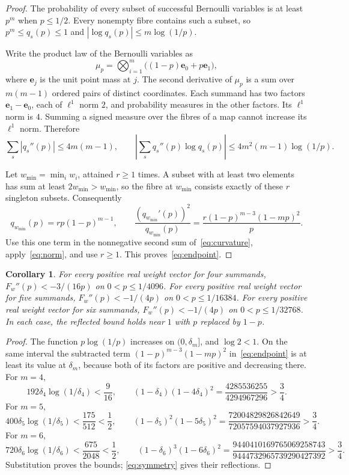 \documentclass[11pt,a4paper]{article}
\numberwithin{equation}{section}
\newtheorem{corollary}[theorem]{Corollary}
\theoremstyle{remark}
\begin{document}
\begin{proof}
The probability of every subset of successful Bernoulli variables is at least $p^m$ when $p\le1/2$. Every nonempty fibre contains such a subset, so $p^m\le q_s(p)\le1$ and $|\log q_s(p)|\le m\log(1/p)$.

Write the product law of the Bernoulli variables as
\[
 \mu_p=\bigotimes_{i=1}^m\bigl((1-p)\mathbf e_0+p\mathbf e_1\bigr),
\]
where $\mathbf e_j$ is the unit point mass at $j$. The second derivative of $\mu_p$ is a sum over $m(m-1)$ ordered pairs of distinct coordinates. Each summand has two factors $\mathbf e_1-\mathbf e_0$, each of $\ell^1$ norm $2$, and probability measures in the other factors. Its $\ell^1$ norm is $4$. Summing a signed measure over the fibres of a map cannot increase its $\ell^1$ norm. Therefore
\begin{equation}\label{eq:norm}
 \sum_s|q_s''(p)|\le4m(m-1),\qquad
 \left|\sum_s q_s''(p)\log q_s(p)\right|
 \le4m^2(m-1)\log(1/p).
\end{equation}

Let $w_{\min}=\min_i w_i$, attained $r\ge1$ times. A subset with at least two elements has sum at least $2w_{\min}>w_{\min}$, so the fibre at $w_{\min}$ consists exactly of these $r$ singleton subsets. Consequently
\[
 q_{w_{\min}}(p)=rp(1-p)^{m-1},\qquad
 \frac{(q_{w_{\min}}'(p))^2}{q_{w_{\min}}(p)}
 =\frac{r(1-p)^{m-3}(1-mp)^2}{p}.
\]
Use this one term in the nonnegative second sum of~\eqref{eq:curvature}, apply~\eqref{eq:norm}, and use $r\ge1$. This proves~\eqref{eq:endpoint}.
\end{proof}

\begin{corollary}\label{cor:endpoint}
For every positive real weight vector for four summands,
$F_w''(p)<-3/(16p)$ on $0<p\le1/4096$. For every positive real weight vector for five summands,
$F_w''(p)<-1/(4p)$ on $0<p\le1/16384$.
For every positive real weight vector for six summands,
$F_w''(p)<-1/(4p)$ on $0<p\le1/32768$.
In each case, the reflected bound holds near $1$ with $p$ replaced by $1-p$.
\end{corollary}

\begin{proof}
The function $p\log(1/p)$ increases on $(0,\delta_m]$, and $\log2<1$. On the same interval the subtracted term $(1-p)^{m-3}(1-mp)^2$ in~\eqref{eq:endpoint} is at least its value at $\delta_m$, because both of its factors are positive and decreasing there. For $m=4$,
\[
192\delta_4\log(1/\delta_4)<\frac9{16},\qquad
(1-\delta_4)(1-4\delta_4)^2
 =\frac{4285536255}{4294967296}>\frac34.
\]
For $m=5$,
\[
400\delta_5\log(1/\delta_5)<\frac{175}{512}<\frac12,\qquad
(1-\delta_5)^2(1-5\delta_5)^2
 =\frac{72004829826842649}{72057594037927936}>\frac34.
\]
For $m=6$,
\[
720\delta_6\log(1/\delta_6)<\frac{675}{2048}<\frac12,\qquad
(1-\delta_6)^3(1-6\delta_6)^2
=\frac{9440410169765069258743}{9444732965739290427392}>\frac34.
\]
Substitution proves the bounds; \eqref{eq:symmetry} gives their reflections.
\end{proof}
\end{document}
